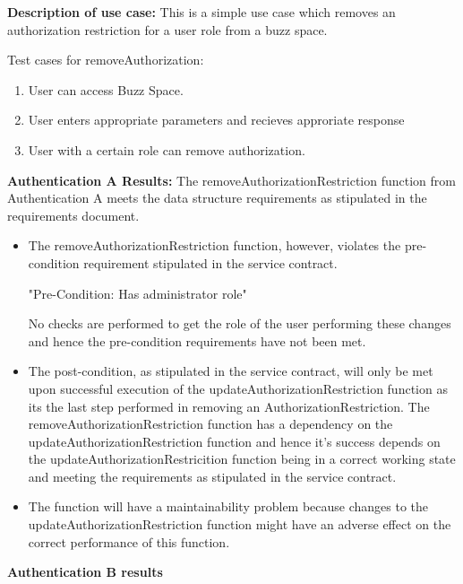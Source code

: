 \textbf{Description of use case:}\newline
This is a simple use case which removes an authorization restriction for a user role from a buzz space.
\medskip

\noindent
Test cases for removeAuthorization:
\begin{enumerate}
	\item User can access Buzz Space.
	\item User enters appropriate parameters and recieves approriate response
	\item User with a certain role can remove authorization.
\end{enumerate}

\noindent
\textbf{Authentication A Results:} \newline
\noindent
The removeAuthorizationRestriction function from Authentication A meets the data structure requirements as stipulated in the requirements document.

\begin{itemize}
\item The removeAuthorizationRestriction function, however, violates the pre-condition requirement stipulated in the service contract.

  "Pre-Condition: Has administrator role"

No checks are performed to get the role of the user performing these changes and hence
the pre-condition requirements have not been met.

\item The post-condition, as stipulated in the service contract, will only be met upon successful execution of the updateAuthorizationRestriction function as its the last step performed in removing an AuthorizationRestriction. The removeAuthorizationRestriction function has a dependency on the updateAuthorizationRestriction function and hence it's success depends on the updateAuthorizationRestricition function being in a correct working state and meeting the requirements as stipulated in the service contract.

\item The function will have a maintainability problem because changes to the updateAuthorizationRestriction function 
might have an adverse effect on the correct performance of this function.
\end{itemize}

\noindent
\textbf{Authentication B results}\newline

